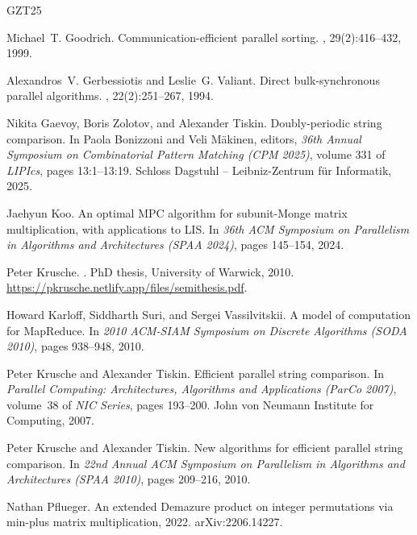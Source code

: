 \documentclass[10pt]{article}
\begin{document}
\begin{thebibliography}{GZT25}

Michael~T. Goodrich.
\newblock Communication-efficient parallel sorting.
, 29(2):416--432, 1999.

Alexandros~V. Gerbessiotis and Leslie~G. Valiant.
\newblock Direct bulk-synchronous parallel algorithms.
, 22(2):251--267,
  1994.

Nikita Gaevoy, Boris Zolotov, and Alexander Tiskin.
\newblock Doubly-periodic string comparison.
\newblock In Paola Bonizzoni and Veli M{\"a}kinen, editors, {\em 36th Annual
  Symposium on Combinatorial Pattern Matching (CPM 2025)}, volume 331 of {\em
  LIPIcs}, pages 13:1--13:19. Schloss Dagstuhl -- Leibniz-Zentrum f\"{u}r
  Informatik, 2025.

Jaehyun Koo.
\newblock An optimal {MPC} algorithm for subunit-{M}onge matrix multiplication,
  with applications to {LIS}.
\newblock In {\em 36th ACM Symposium on Parallelism in Algorithms and
  Architectures (SPAA 2024)}, pages 145--154, 2024.

Peter Krusche.
.
\newblock PhD thesis, University of Warwick, 2010.
\newblock \url{https://pkrusche.netlify.app/files/semithesis.pdf}.

Howard Karloff, Siddharth Suri, and Sergei Vassilvitskii.
\newblock A model of computation for {M}ap{R}educe.
\newblock In {\em 2010 ACM-SIAM Symposium on Discrete Algorithms (SODA 2010)},
  pages 938--948, 2010.

Peter Krusche and Alexander Tiskin.
\newblock Efficient parallel string comparison.
\newblock In {\em Parallel Computing: Architectures, Algorithms and
  Applications (ParCo 2007)}, volume~38 of {\em NIC Series}, pages 193--200.
  John von Neumann Institute for Computing, 2007.

Peter Krusche and Alexander Tiskin.
\newblock New algorithms for efficient parallel string comparison.
\newblock In {\em 22nd Annual ACM Symposium on Parallelism in Algorithms and
  Architectures (SPAA 2010)}, pages 209--216, 2010.

Nathan Pflueger.
\newblock An extended {D}emazure product on integer permutations via min-plus
  matrix multiplication, 2022.
\newblock arXiv:2206.14227.


\end{thebibliography}
\end{document}
